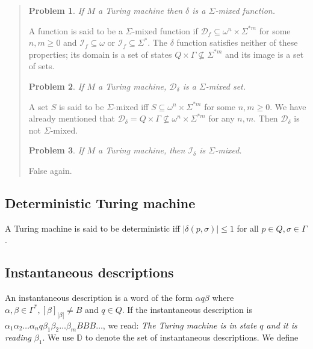 \documentclass[a4paper, 12pt]{article}
\newtheorem{problem}{Problem}
\newtheorem{problem}{Problem}
\begin{document}
\small
\begin{quote}

\begin{problem}
    If $M$ a Turing machine then $\delta$ is a $\Sigma$-mixed function.
\end{problem}

A function is said to be a $\Sigma$-mixed function if $\mathcal{D}_f \subseteq
\omega^n \times \Sigma^{*m}$ for some $n, m \geq 0$ and $\mathcal{I}_f \subseteq
\omega$ or $\mathcal{I}_f \subseteq \Sigma^{*}$. The $\delta$ function satisfies
neither of these properties; its domain is a set of states $Q \times \Gamma \not\subseteq
\Sigma^{*m}$ and its image is a set of sets.

\begin{problem}
    If $M$ a Turing machine, $\mathcal{D}_{\delta}$ is a $\Sigma$-mixed set.
\end{problem}

A set $S$ is said to be $\Sigma$-mixed iff $S \subseteq \omega^n \times
\Sigma^{*m}$ for some $n, m \geq 0$. We have already mentioned that
$\mathcal{D}_\delta = Q \times \Gamma \not\subseteq \omega^n \times \Sigma^{*m}$ for any $n,
m$. Then $\mathcal{D}_\delta$ is not $\Sigma$-mixed.

\begin{problem}
    If $M$ a Turing machine, then $\mathcal{I}_{\delta}$ is $\Sigma$-mixed.
\end{problem}

False again.

\end{quote}
\normalsize


\subsection{Deterministic Turing machine}

A Turing machine is said to be deterministic iff $|\delta(p, \sigma)| \leq 1$
for all $p \in Q, \sigma \in \Gamma$. 

\subsection{Instantaneous descriptions}

An instantaneous description is a word of the form $\alpha q \beta $ where
$\alpha, \beta \in \Gamma^{*}, [\beta]_{|\beta |} \neq B$ and $q \in Q$. If the
instantaneous description is $\alpha_1 \alpha_2 \ldots \alpha_n q \beta_1
\beta_2 \ldots \beta_m B B B \ldots$, we read: \textit{The Turing
machine is in state $q$ and it is reading $\beta_1$}. We use $\mathbb{D}$ to
denote the set of instantaneous descriptions. We define 
\end{document}
